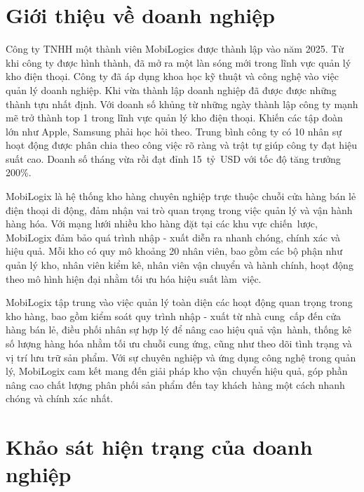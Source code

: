 \documentclass[a4paper,12pt]{report}
\begin{document}
\section{Giới thiệu về doanh nghiệp}
\quad Công ty TNHH một thành viên MobiLogics được thành lập vào năm 2025. Từ khi công ty được hình thành, đã mở ra một làn sóng mới trong lĩnh vực quản lý kho điện thoại. Công ty đã áp dụng khoa học kỹ thuật và công nghệ vào việc quản lý doanh nghiệp. Khi vừa thành lập doanh nghiệp đã được được những thành tựu nhất định. Với doanh số khủng từ những ngày thành lập công ty mạnh mẽ trở thành top 1 trong lĩnh vực quản lý kho điện thoại. Khiến các tập đoàn lớn như Apple, Samsung phải học hỏi theo. Trung bình công ty có 10 nhân sự hoạt động được phân chia theo công việc rõ ràng và trật tự giúp công ty đạt hiệu suất cao. Doanh số tháng vừa rồi đạt đỉnh 15~tỷ~USD với tốc độ tăng trưởng 200\%.

\vspace{0.8em}

\quad MobiLogix là hệ thống kho hàng chuyên nghiệp trực thuộc chuỗi cửa hàng bán lẻ điện thoại di động, đảm nhận vai trò quan trọng trong việc quản lý và vận hành hàng hóa. Với mạng lưới nhiều kho hàng đặt tại các khu vực chiến~lược, MobiLogix đảm bảo quá trình nhập - xuất diễn ra nhanh chóng, chính xác và hiệu quả. Mỗi kho có quy mô khoảng 20 nhân viên, bao gồm các bộ phận như quản lý kho, nhân viên kiểm kê, nhân viên vận chuyển và hành chính, hoạt động theo mô hình hiện đại nhằm tối ưu hóa hiệu suất làm~việc.

\vspace{0.8em}

\quad MobiLogix tập trung vào việc quản lý toàn diện các hoạt động quan trọng trong kho hàng, bao gồm kiểm soát quy trình nhập - xuất từ nhà cung~cấp đến cửa hàng bán lẻ, điều phối nhân sự hợp lý để nâng cao hiệu quả vận~hành, thống kê số lượng hàng hóa nhằm tối ưu chuỗi cung ứng, cũng như theo dõi tình trạng và vị trí lưu trữ sản phẩm. Với sự chuyên nghiệp và ứng dụng công nghệ trong quản lý, MobiLogix cam kết mang đến giải pháp kho vận~chuyển hiệu quả, góp phần nâng cao chất lượng phân phối sản phẩm đến tay khách~hàng một cách nhanh chóng và chính xác nhất.

\section{Khảo sát hiện trạng của doanh nghiệp}
\end{document}
